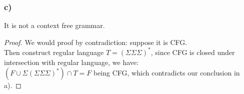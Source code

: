 \documentclass{article}
\begin{document}
\subsubsection{c)}
	It is not a context free grammar.
	\begin{proof}
		We would proof by contradiction: suppose it is CFG. \\
		Then construct regular language $T = (\Sigma\Sigma\Sigma)^*$, since CFG is closed under intersection with regular language, we have:\\
		$(F\cup\Sigma(\Sigma\Sigma\Sigma)^*) \cap T = F$ being CFG, which contradicts our conclusion in a).
	\end{proof}
\end{document}
